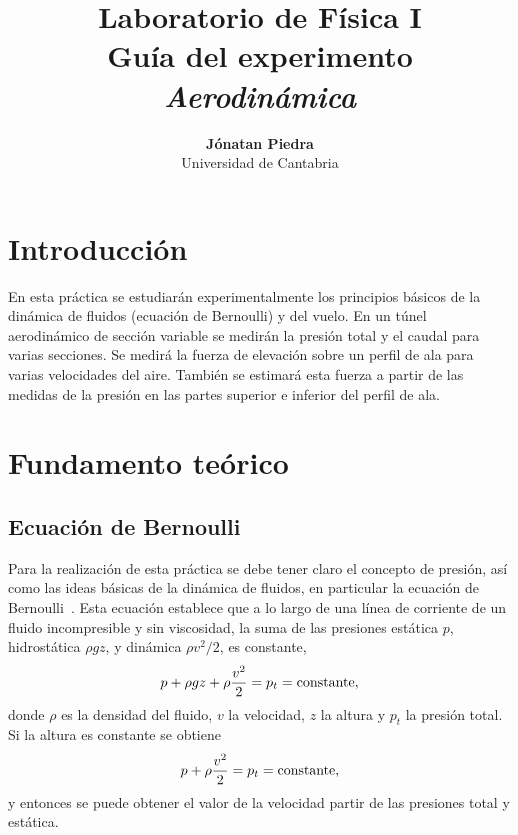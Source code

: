 \documentclass[11pt]{articulo}
\begin{document}
\title{\bf Laboratorio de F\'isica I\\
  Gu\'ia del experimento \emph{Aerodin\'amica}} 
\author{
  {\bf J\'onatan Piedra}\\
  Universidad de Cantabria}
\maketitle


\section{Introducci\'on}

En esta pr\'actica se estudiar\'an experimentalmente los principios b\'asicos de la din\'amica de fluidos (ecuaci\'on de Bernoulli) y del vuelo. En un t\'unel aerodin\'amico de secci\'on variable se medir\'an la presi\'on total y el caudal para varias secciones. Se medir\'a la fuerza de elevaci\'on sobre un perfil de ala para varias velocidades del aire. Tambi\'en se estimar\'a esta fuerza a partir de las medidas de la presi\'on en las partes superior e inferior del perfil de ala.


\section{Fundamento te\'orico}

\subsection{Ecuaci\'on de Bernoulli}

Para la realizaci\'on de esta pr\'actica se debe tener claro el concepto de presi\'on, as\'i como las ideas b\'asicas de la din\'amica de fluidos, en particular la ecuaci\'on de Bernoulli~\cite{tipler}. Esta ecuaci\'on establece que a lo largo de una l\'inea de corriente de un fluido incompresible y sin viscosidad, la suma de las presiones est\'atica $p$, hidrost\'atica $\rho g z$, y din\'amica $\rho v^2/2$, es constante,
%
\begin{equation*}
p + \rho g z + \rho \frac{v^2}{2} = p_t = {\rm constante},
\end{equation*}
%
donde $\rho$ es la densidad del fluido, $v$ la velocidad, $z$ la altura y $p_t$ la presi\'on total. Si la altura es constante se obtiene
%
\begin{equation*}
p + \rho \frac{v^2}{2} = p_t = {\rm constante},
\end{equation*}
%
y entonces se puede obtener el valor de la velocidad partir de las presiones total y est\'atica.
\end{document}
